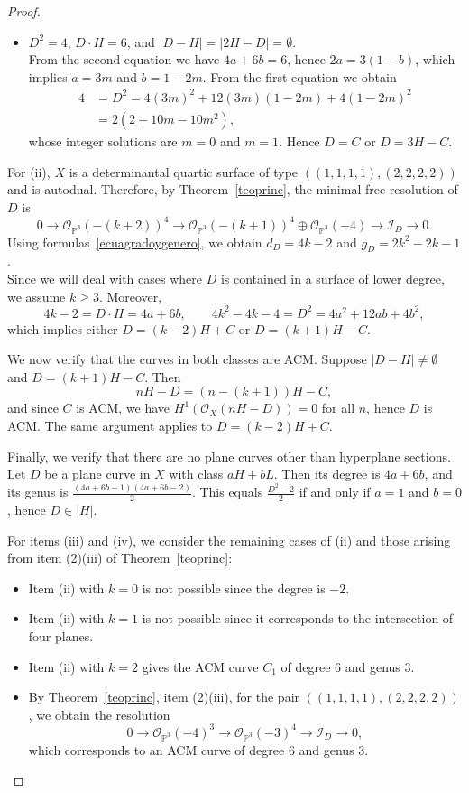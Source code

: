 \documentclass[12pt,reqno]{amsart}
\theoremstyle{plain}
\theoremstyle{definition}
\theoremstyle{remark}
\theoremstyle{definition}
\newcommand{\PP}{\mathds{P}}
\newcommand{\PPP}{\PP^{3}}
\newcommand{\ii}{\mathscr{I}}
\newcommand{\oo}{\mathcal{O}}
\begin{document}
\begin{proof}
\begin{itemize}
    \item $D^{2} = 4$, $D \cdot H = 6$, and $|D-H| = |2H-D| = \emptyset$.\\
    From the second equation we have $4a + 6b = 6$, hence $2a = 3(1-b)$, which implies $a = 3m$ and $b = 1 - 2m$. From the first equation we obtain
    \begin{align*}
        4 &= D^{2} = 4(3m)^{2} + 12(3m)(1-2m) + 4(1-2m)^{2} \\
          &= 2(2 + 10m - 10m^{2}),
    \end{align*}
    whose integer solutions are $m=0$ and $m=1$. Hence $D=C$ or $D=3H-C$.
\end{itemize}

For (ii), $X$ is a determinantal quartic surface of type $((1,1,1,1),(2,2,2,2))$ and is autodual. Therefore, by Theorem~\ref{teoprinc}, the minimal free resolution of $D$ is
\[
0 \to \oo_{\PPP}(-(k+2))^{4} \to \oo_{\PPP}(-(k+1))^{4} \oplus \oo_{\PPP}(-4) \to \ii_{D} \to 0.
\]
Using formulas~\eqref{ecuagradoygenero}, we obtain $d_{D} = 4k - 2$ and $g_{D} = 2k^{2} - 2k - 1$.\\
Since we will deal with cases where $D$ is contained in a surface of lower degree, we assume $k \geq 3$. Moreover,
\[
4k-2 = D \cdot H = 4a + 6b, \qquad 4k^{2} - 4k - 4 = D^{2} = 4a^{2} + 12ab + 4b^{2},
\]
which implies either $D = (k-2)H + C$ or $D = (k+1)H - C$.

We now verify that the curves in both classes are ACM. Suppose $|D-H| \neq \emptyset$ and $D = (k+1)H - C$. Then
\[
nH - D = (n - (k+1))H - C,
\]
and since $C$ is ACM, we have $H^{1}(\oo_{X}(nH-D)) = 0$ for all $n$, hence $D$ is ACM. The same argument applies to $D = (k-2)H + C$.

Finally, we verify that there are no plane curves other than hyperplane sections. Let $D$ be a plane curve in $X$ with class $aH + bL$. Then its degree is $4a + 6b$, and its genus is $\frac{(4a+6b-1)(4a+6b-2)}{2}$. This equals $\frac{D^{2}-2}{2}$ if and only if $a=1$ and $b=0$, hence $D \in |H|$.

For items (iii) and (iv), we consider the remaining cases of (ii) and those arising from item (2)(iii) of Theorem~\ref{teoprinc}:
\begin{itemize}
    \item[Case 1:] Item (ii) with $k=0$ is not possible since the degree is $-2$.
    \item[Case 2:] Item (ii) with $k=1$ is not possible since it corresponds to the intersection of four planes.
    \item[Case 3:] Item (ii) with $k=2$ gives the ACM curve $C_{1}$ of degree $6$ and genus $3$.
    \item[Case 4:] By Theorem~\ref{teoprinc}, item (2)(iii), for the pair $((1,1,1,1),(2,2,2,2))$, we obtain the resolution
    \[
    0 \to \oo_{\PPP}(-4)^{3} \to \oo_{\PPP}(-3)^{4} \to \ii_{D} \to 0,
    \]
    which corresponds to an ACM curve of degree $6$ and genus $3$.
\end{itemize}


\end{proof}
\end{document}
